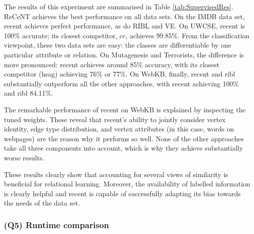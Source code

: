 The results of this experiment are summarised in Table \ref{tab:SupervisedRes}.
ReCeNT achieves the best performance on all data sets.
On the IMDB data set, \gls{recent} achieves perfect performance, as do RIBL and VE.  On UWCSE, \gls{recent} is 100\% accurate; its closest competitor, \gls{cc}, achieves 99.85\%.
From the classification viewpoint, these two data sets are easy: the classes are differentiable by one particular attribute or relation.
On Mutagenesis and Terrorists, the difference is more pronounced: \gls{recent} achieves around 85\% accuracy, with its closest competitor (\gls{hsag}) achieving 76\% or 77\%.
On WebKB, finally, \gls{recent} and \gls{ribl} substantially outperform all the other approaches, with \gls{recent} achieving 100\% and \gls{ribl} 84.11\%.

The remarkable performance of \gls{recent} on WebKB is explained by inspecting the tuned weights.  These reveal that \gls{recent}'s ability to jointly consider vertex identity, edge type distribution, and vertex attributes (in this case, words on webpages) are the reason why it performs so well.  None of the other approaches take all three components into account, which is why they achieve substantially worse results.

These results clearly show that accounting for several views of similarity is beneficial for relational learning.
Moreover, the availability of labelled information is clearly helpful and \gls{recent} is capable of successfully adapting its bias towards the needs of the data set.





\subsubsection{\textbf{(Q5) Runtime comparison}}

